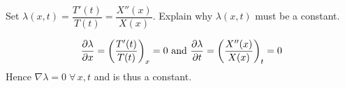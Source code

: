 Set $\lambda(x,t) = \dfrac{T'(t)}{T(t)} = \dfrac{X''(x)}{X(x)}$. Explain why $\lambda(x,t)$ must be a constant.

\soln*

$$\pdv{\lambda}{x} = \pfrac{T'(t)}{T(t)}_x= 0 \text{ and } \pdv{\lambda}{t} = \pfrac{X''(x)}{X(x)}_t= 0$$
Hence $\nabla \lambda = 0 \; \forall\, x, t$ and is thus a constant.